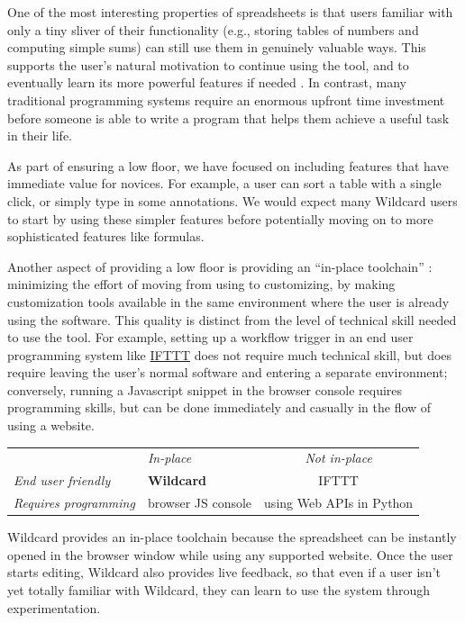 \documentclass[english,submission]{programming}
\begin{document}
One of the most interesting properties of spreadsheets is that users
familiar with only a tiny sliver of their functionality (e.g., storing
tables of numbers and computing simple sums) can still use them in
genuinely valuable ways. This supports the user's natural motivation to
continue using the tool, and to eventually learn its more powerful
features if needed \autocite{nardi1991}. In contrast, many traditional
programming systems require an enormous upfront time investment before
someone is able to write a program that helps them achieve a useful task
in their life.

As part of ensuring a low floor, we have focused on including features
that have immediate value for novices. For example, a user can sort a
table with a single click, or simply type in some annotations. We would
expect many Wildcard users to start by using these simpler features
before potentially moving on to more sophisticated features like
formulas.

Another aspect of providing a low floor is providing an ``in-place
toolchain'' \autocite{2019}: minimizing the effort of moving from using
to customizing, by making customization tools available in the same
environment where the user is already using the software. This quality
is distinct from the level of technical skill needed to use the tool.
For example, setting up a workflow trigger in an end user programming
system like \href{https://ifttt.com/}{IFTTT} does not require much
technical skill, but does require leaving the user's normal software and
entering a separate environment; conversely, running a Javascript
snippet in the browser console requires programming skills, but can be
done immediately and casually in the flow of using a website.

\begin{longtable}[]{@{}llc@{}}
\toprule
\endhead
& \emph{In-place} & \emph{Not in-place}\tabularnewline
\emph{End user friendly} & \textbf{Wildcard} & IFTTT\tabularnewline
\emph{Requires programming} & browser JS console & using Web APIs in
Python\tabularnewline
\bottomrule
\end{longtable}

Wildcard provides an in-place toolchain because the spreadsheet can be
instantly opened in the browser window while using any supported
website. Once the user starts editing, Wildcard also provides live
feedback, so that even if a user isn't yet totally familiar with
Wildcard, they can learn to use the system through experimentation.
\end{document}
